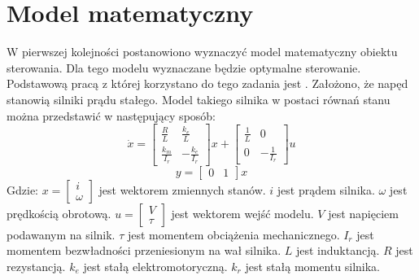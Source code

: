 \section{Model matematyczny}
\label{sec:model}

W pierwszej kolejności postanowiono wyznaczyć model matematyczny obiektu sterowania. Dla tego modelu wyznaczane będzie optymalne sterowanie. Podstawową pracą z której korzystano do tego zadania jest \cite{Babazadeh}. Założono, że napęd stanowią silniki prądu stałego. Model takiego silnika w postaci równań stanu można przedstawić w następujący sposób:
\begin{equation}
\dot{x}=
\begin{bmatrix}
	\frac{R}{L} & \frac{k_e}{L} \\
	\frac{k_m}{I_r} & -\frac{k_e}{I_r}
\end{bmatrix}
x+
\begin{bmatrix}
	\frac{1}{L} & 0 \\
	0 & -\frac{1}{I_r}
\end{bmatrix}
u
\label{eq:dc_model_x}
\end{equation}
\begin{equation}
y=
\begin{bmatrix}
	0 & 1
\end{bmatrix}
x
\label{eq:dc_model_y}
\end{equation}
\noindent Gdzie:\newline
\(x=
\begin{bmatrix}
	i \\
	\omega
\end{bmatrix}\) jest wektorem zmiennych stanów.\newline
\(i\) jest prądem silnika.\newline
\(\omega\) jest prędkością obrotową.\newline
\(u=
\begin{bmatrix}
	V \\
	\tau
\end{bmatrix}\) jest wektorem wejść modelu.\newline
\(V\) jest napięciem podawanym na silnik.\newline
\(\tau\) jest momentem obciążenia mechanicznego.\newline
\(I_r\) jest momentem bezwładności przeniesionym na wał silnika.\newline
\(L\) jest induktancją.\newline
\(R\) jest rezystancją.\newline
\(k_e\) jest stałą elektromotoryczną.\newline
\(k_r\) jest stałą momentu silnika.

